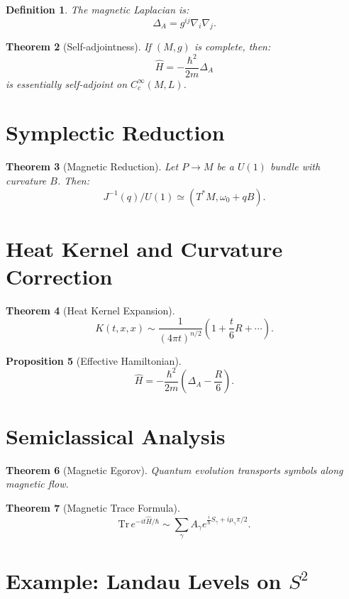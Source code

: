 \documentclass[11pt]{article}
\newtheorem{theorem}{Theorem}[section]
\newtheorem{proposition}[theorem]{Proposition}
\newtheorem{definition}[theorem]{Definition}
\begin{document}
\begin{definition}
The magnetic Laplacian is:
\[
\Delta_A = g^{ij}\nabla_i\nabla_j.
\]
\end{definition}

\begin{theorem}[Self-adjointness]
If $(M,g)$ is complete, then:
\[
\hat{H} = -\frac{\hbar^2}{2m}\Delta_A
\]
is essentially self-adjoint on $C_c^\infty(M,L)$.
\end{theorem}

\section{Symplectic Reduction}

\begin{theorem}[Magnetic Reduction]
Let $P\to M$ be a $U(1)$ bundle with curvature $B$. Then:
\[
J^{-1}(q)/U(1) \simeq (T^*M,\omega_0 + qB).
\]
\end{theorem}

\section{Heat Kernel and Curvature Correction}

\begin{theorem}[Heat Kernel Expansion]
\[
K(t,x,x) \sim \frac{1}{(4\pi t)^{n/2}}(1 + \frac{t}{6}R + \cdots).
\]
\end{theorem}

\begin{proposition}[Effective Hamiltonian]
\[
\hat{H} =
-\frac{\hbar^2}{2m}\left(\Delta_A - \frac{R}{6}\right).
\]
\end{proposition}

\section{Semiclassical Analysis}

\begin{theorem}[Magnetic Egorov]
Quantum evolution transports symbols along magnetic flow.
\end{theorem}

\begin{theorem}[Magnetic Trace Formula]
\[
\mathrm{Tr}\, e^{-it\hat{H}/\hbar}
\sim \sum_\gamma
A_\gamma e^{\frac{i}{\hbar}S_\gamma + i\mu_\gamma\pi/2}.
\]
\end{theorem}

\section{Example: Landau Levels on $S^2$}
\end{document}
